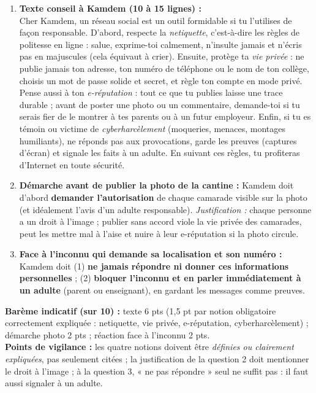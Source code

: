 \documentclass[11pt]{article}
\begin{document}
\begin{corrige}
\begin{enumerate}
\item \textbf{Texte conseil à Kamdem (10 à 15 lignes) :}\\
Cher Kamdem, un réseau social est un outil formidable si tu l'utilises de façon responsable. D'abord, respecte la \emph{netiquette}, c'est-à-dire les règles de politesse en ligne : salue, exprime-toi calmement, n'insulte jamais et n'écris pas en majuscules (cela équivaut à crier). Ensuite, protège ta \emph{vie privée} : ne publie jamais ton adresse, ton numéro de téléphone ou le nom de ton collège, choisis un mot de passe solide et secret, et règle ton compte en mode privé. Pense aussi à ton \emph{e-réputation} : tout ce que tu publies laisse une trace durable ; avant de poster une photo ou un commentaire, demande-toi si tu serais fier de le montrer à tes parents ou à un futur employeur. Enfin, si tu es témoin ou victime de \emph{cyberharcèlement} (moqueries, menaces, montages humiliants), ne réponds pas aux provocations, garde les preuves (captures d'écran) et signale les faits à un adulte. En suivant ces règles, tu profiteras d'Internet en toute sécurité.
\item \textbf{Démarche avant de publier la photo de la cantine :} Kamdem doit d'abord \textbf{demander l'autorisation} de chaque camarade visible sur la photo (et idéalement l'avis d'un adulte responsable). \emph{Justification :} chaque personne a un droit à l'image ; publier sans accord viole la vie privée des camarades, peut les mettre mal à l'aise et nuire à leur e-réputation si la photo circule.
\item \textbf{Face à l'inconnu qui demande sa localisation et son numéro :} Kamdem doit (1) \textbf{ne jamais répondre ni donner ces informations personnelles} ; (2) \textbf{bloquer l'inconnu et en parler immédiatement à un adulte} (parent ou enseignant), en gardant les messages comme preuves.
\end{enumerate}
\textbf{Barème indicatif (sur 10) :} texte 6 pts (1,5 pt par notion obligatoire correctement expliquée : netiquette, vie privée, e-réputation, cyberharcèlement) ; démarche photo 2 pts ; réaction face à l'inconnu 2 pts.\\
\textbf{Points de vigilance :} les quatre notions doivent être \emph{définies ou clairement expliquées}, pas seulement citées ; la justification de la question 2 doit mentionner le droit à l'image ; à la question 3, « ne pas répondre » seul ne suffit pas : il faut aussi signaler à un adulte.
\end{corrige}
\end{document}
